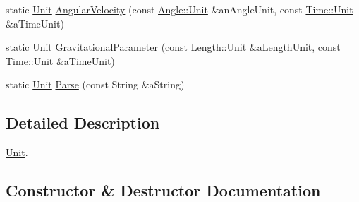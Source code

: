 \begin{DoxyCompactItemize}
\item 
static \hyperlink{classlibrary_1_1physics_1_1units_1_1_derived_1_1_unit}{Unit} \hyperlink{classlibrary_1_1physics_1_1units_1_1_derived_1_1_unit_addd355a633d2d5addd72efdd7cfebc65}{Angular\+Velocity} (const \hyperlink{classlibrary_1_1physics_1_1units_1_1_angle_a3c329d415a61783b16ce481874cc5956}{Angle\+::\+Unit} \&an\+Angle\+Unit, const \hyperlink{classlibrary_1_1physics_1_1units_1_1_time_ab876a6a05c9a2f28905f2753bfd64109}{Time\+::\+Unit} \&a\+Time\+Unit)
\item 
static \hyperlink{classlibrary_1_1physics_1_1units_1_1_derived_1_1_unit}{Unit} \hyperlink{classlibrary_1_1physics_1_1units_1_1_derived_1_1_unit_a583c1a64f6220c2a9296f3aa4a2ad989}{Gravitational\+Parameter} (const \hyperlink{classlibrary_1_1physics_1_1units_1_1_length_a3b8b39cd245cf6b19dc34459baeccb18}{Length\+::\+Unit} \&a\+Length\+Unit, const \hyperlink{classlibrary_1_1physics_1_1units_1_1_time_ab876a6a05c9a2f28905f2753bfd64109}{Time\+::\+Unit} \&a\+Time\+Unit)
\item 
static \hyperlink{classlibrary_1_1physics_1_1units_1_1_derived_1_1_unit}{Unit} \hyperlink{classlibrary_1_1physics_1_1units_1_1_derived_1_1_unit_aa712ff5245e4badf615c04f8e1cbdb51}{Parse} (const String \&a\+String)
\end{DoxyCompactItemize}


\subsection{Detailed Description}
\hyperlink{classlibrary_1_1physics_1_1units_1_1_derived_1_1_unit}{Unit}. 

\subsection{Constructor \& Destructor Documentation}
\mbox{\label{classlibrary_1_1physics_1_1units_1_1_derived_1_1_unit_ab68c758223d70f32011fb674ae57c77e}} 
